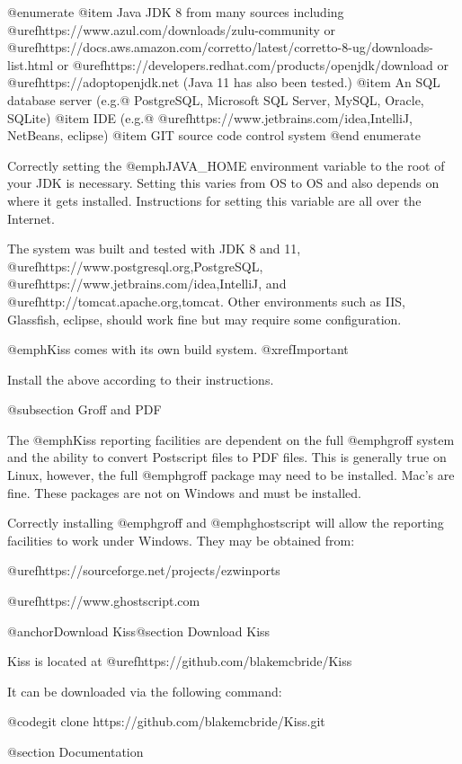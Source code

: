 @enumerate
@item
Java JDK 8 from many sources including @uref{https://www.azul.com/downloads/zulu-community} or 
@uref{https://docs.aws.amazon.com/corretto/latest/corretto-8-ug/downloads-list.html} or
@uref{https://developers.redhat.com/products/openjdk/download} or
@uref{https://adoptopenjdk.net}  (Java 11 has also been tested.)
@item
An SQL database server (e.g.@ PostgreSQL, Microsoft SQL Server, MySQL,
Oracle, SQLite)
@item
IDE (e.g.@ @uref{https://www.jetbrains.com/idea,IntelliJ}, NetBeans, eclipse)
@item
GIT source code control system
@end enumerate

Correctly setting the @emph{JAVA_HOME} environment variable to the root of your
JDK is necessary.  Setting this varies from OS to OS and also depends on where it
gets installed.  Instructions for setting this variable are all over the Internet.

The system was built and tested with JDK 8 and 11,
@uref{https://www.postgresql.org,PostgreSQL},
@uref{https://www.jetbrains.com/idea,IntelliJ}, and
@uref{http://tomcat.apache.org,tomcat}.  Other environments such as
IIS, Glassfish, eclipse, should work fine but may require some
configuration.

@emph{Kiss} comes with its own build system.  @xref{Important}

Install the above according to their instructions.

@subsection Groff and PDF

The @emph{Kiss} reporting facilities are dependent on the full
@emph{groff} system and the ability to convert Postscript files to PDF
files.  This is generally true on Linux, however, the full
@emph{groff} package may need to be installed.  Mac's are fine.  These
packages are not on Windows and must be installed.

Correctly installing @emph{groff} and @emph{ghostscript} will allow the
reporting facilities to work under Windows.  They may be obtained from:

@uref{https://sourceforge.net/projects/ezwinports}

@uref{https://www.ghostscript.com}


@anchor{Download Kiss}@section Download Kiss

Kiss is located at @uref{https://github.com/blakemcbride/Kiss}

It can be downloaded via the following command:

@code{git clone https://github.com/blakemcbride/Kiss.git}

@section Documentation

